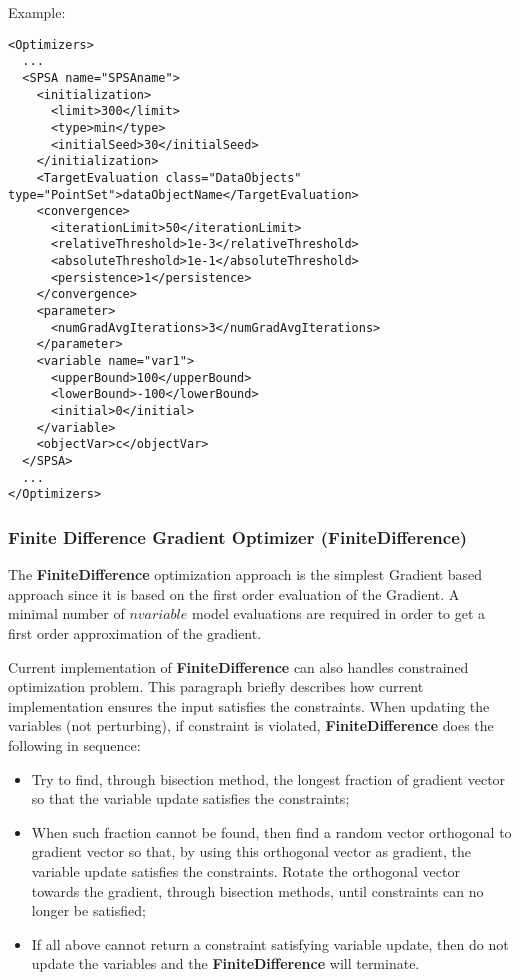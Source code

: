 Example:
\begin{lstlisting}[style=XML]
<Optimizers>
  ...
  <SPSA name="SPSAname">
    <initialization>
      <limit>300</limit>
      <type>min</type>
      <initialSeed>30</initialSeed>
    </initialization>
    <TargetEvaluation class="DataObjects" type="PointSet">dataObjectName</TargetEvaluation>
    <convergence>
      <iterationLimit>50</iterationLimit>
      <relativeThreshold>1e-3</relativeThreshold>
      <absoluteThreshold>1e-1</absoluteThreshold>
      <persistence>1</persistence>
    </convergence>
    <parameter>
      <numGradAvgIterations>3</numGradAvgIterations>
    </parameter>
    <variable name="var1">
      <upperBound>100</upperBound>
      <lowerBound>-100</lowerBound>
      <initial>0</initial>
    </variable>
    <objectVar>c</objectVar>
  </SPSA>
  ...
</Optimizers>
\end{lstlisting}


\subsubsection{Finite Difference Gradient Optimizer (FiniteDifference)}
\label{subsubsubsec:FiniteDifference}
The \textbf{FiniteDifference} optimization approach is  the simplest Gradient based approach since it is based on the
first order evaluation of the Gradient.  A minimal number of $n variable$
model evaluations are required in order to get a first order approximation of the gradient.

Current implementation of \textbf{FiniteDifference} can also handles
constrained optimization problem. This paragraph briefly describes how current implementation ensures the input satisfies the
constraints. When updating the variables (not perturbing), if constraint is violated, \textbf{FiniteDifference} does the following in
sequence:
\begin{itemize}
\item Try to find, through bisection method, the longest fraction of gradient vector so that the variable update satisfies the
constraints;
\item When such fraction cannot be found, then find a random vector orthogonal to gradient vector so that, by using this
orthogonal vector as gradient, the variable update satisfies the constraints. Rotate the orthogonal vector towards the gradient,
through bisection methods, until constraints can no longer be satisfied;
\item If all above cannot return a constraint satisfying variable update, then do not update the variables and the \textbf{FiniteDifference} will
terminate.
\end{itemize}

